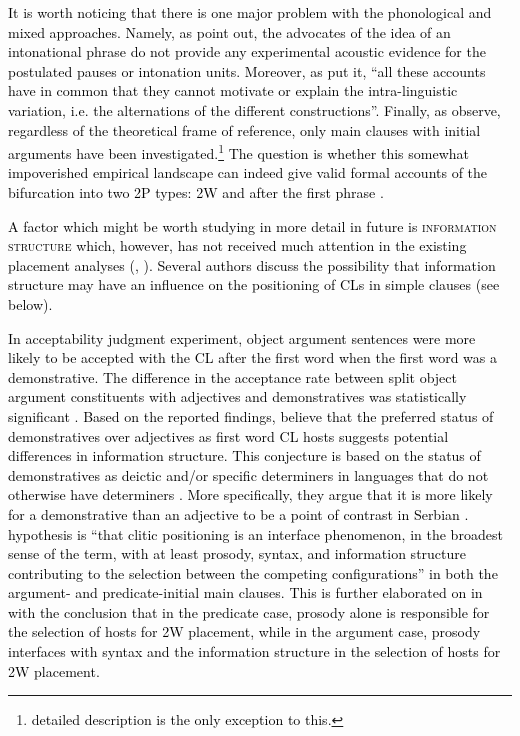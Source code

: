 \textcolor{black}{It is worth noticing that there is one major problem with the phonological and mixed approaches. Namely, as \citet[70]{DFZ09} point out, the advocates of the idea of an intonational phrase do not provide any experimental acoustic evidence for the postulated pauses or intonation units.} \textcolor{black}{ Moreover, as \citet[136]{CavarSeiss11} put it, ``all these accounts have in common that they cannot motivate or explain the intra-linguistic variation, i.e. the alternations of the different constructions''. Finally, as \citet[175]{ZFD17} observe, regardless of the theoretical frame of reference, only main clauses with initial arguments have been investigated.}\footnote{\textcolor{black}{ detailed description is the only exception to this.}} \textcolor{black}{The question is whether this somewhat impoverished empirical landscape can indeed give valid formal accounts of the bifurcation into two 2P types: 2W and after the first phrase \citep[175]{ZFD17}.}

\textcolor{black}{A factor which might be worth studying in more detail in future is \textsc{information structure} which, however, has not received much attention in the existing placement analyses (\citealt[cf.][134]{CavarSeiss11}, \citealt[71f]{DFZ09}). Several authors \citep[e.g.][]{DFZ09, Diesing10, CavarSeiss11, ZFD17, DiesingZec11, DiesingZec17} discuss the possibility that information structure may have an influence on the positioning of CLs in simple clauses (see below).}

\largerpage
\textcolor{black}{In  acceptability judgment experiment, object argument sentences were more likely to be accepted with the CL after the first word when the first word was a demonstrative. The difference in the acceptance rate between split object argument constituents with adjectives and demonstratives was statistically significant \citep[69]{DFZ09}. Based on the reported findings, \citet[69f]{DFZ09} believe that the preferred status of demonstratives over adjectives as first word CL hosts suggests potential differences in information structure. This conjecture is based on the status of demonstratives as deictic and/or specific determiners in languages that do not otherwise have determiners \citep[70]{DFZ09}. More specifically, they argue that it is more likely for a demonstrative than an adjective to be a point of contrast in Serbian \citep[cf.][70]{DFZ09}.  hypothesis is ``that clitic positioning is an interface phenomenon, in the broadest sense of the term, with at least prosody, syntax, and information structure contributing to the selection between the competing configurations'' in both the argument- and predicate-initial main clauses. This is further elaborated on in \citet[13]{DiesingZec17} with the conclusion that in the predicate case, prosody alone is responsible for the selection of hosts for 2W placement, while in the argument case, prosody interfaces with syntax and the information structure in the selection of hosts for 2W placement.}


